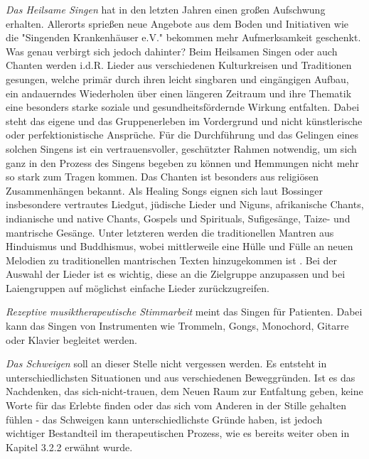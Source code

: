 \emph{Das Heilsame Singen} hat in den letzten Jahren einen großen Aufschwung erhalten. Allerorts sprießen neue Angebote aus dem Boden und Initiativen wie die "Singenden Krankenhäuser e.V." bekommen mehr Aufmerksamkeit geschenkt. Was genau verbirgt sich jedoch dahinter? Beim Heilsamen Singen oder auch Chanten werden i.d.R. Lieder aus verschiedenen Kulturkreisen und Traditionen gesungen, welche primär durch ihren leicht singbaren und eingängigen Aufbau, ein andauerndes Wiederholen über einen längeren Zeitraum und ihre Thematik eine besonders starke soziale und gesundheitsfördernde Wirkung entfalten. Dabei steht das eigene und das Gruppenerleben im Vordergrund und nicht künstlerische oder perfektionistische Ansprüche. Für die Durchführung und das Gelingen eines solchen Singens ist ein vertrauensvoller, geschützter Rahmen notwendig, um sich ganz in den Prozess des Singens begeben zu können und Hemmungen nicht mehr so stark zum Tragen kommen. Das Chanten ist besonders aus religiösen Zusammenhängen bekannt. Als Healing Songs eignen sich laut Bossinger insbesondere vertrautes Liedgut, jüdische Lieder und Niguns, afrikanische Chants, indianische und native Chants, Gospels und Spirituals, Sufigesänge, Taize- und mantrische Gesänge. Unter letzteren werden die traditionellen Mantren aus Hinduismus und Buddhismus, wobei mittlerweile eine Hülle und Fülle an neuen Melodien zu traditionellen mantrischen Texten hinzugekommen ist \autocite[vgl.][266 ff.]{bossinger2006}. Bei der Auswahl der Lieder ist es wichtig, diese an die Zielgruppe anzupassen und bei Laiengruppen auf möglichst einfache Lieder zurückzugreifen.

\emph{Rezeptive musiktherapeutische Stimmarbeit} meint das Singen für Patienten. Dabei kann das Singen von Instrumenten wie Trommeln, Gongs, Monochord, Gitarre oder Klavier begleitet werden. 

\emph{Das Schweigen} soll an dieser Stelle nicht vergessen werden. Es entsteht in unterschiedlichsten Situationen und aus verschiedenen Beweggründen. Ist es das Nachdenken, das sich-nicht-trauen, dem Neuen Raum zur Entfaltung geben, keine Worte für das Erlebte finden oder das sich vom Anderen in der Stille gehalten fühlen - das Schweigen kann unterschiedlichste Gründe haben, ist jedoch wichtiger Bestandteil im therapeutischen Prozess, wie es bereits weiter oben in Kapitel 3.2.2 erwähnt wurde.

